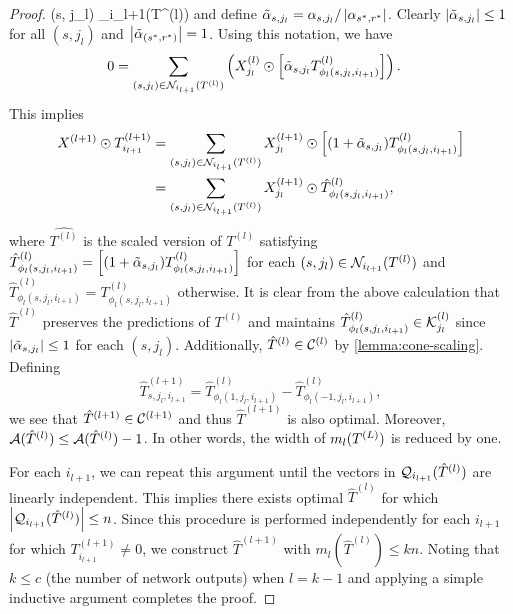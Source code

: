 \begin{proof}
{        (s, j_l) \in \calN_{i_{l+1}}(T^{(l)})} \)
    and define \( \tilde{\alpha}_{s, j_l} = \alpha_{s, j_l} / \left\vert \alpha_{s^* ,r^*}\right\vert \).
    Clearly \( \left\vert \tilde{\alpha}_{s, j_l}\right\vert \leq 1 \) for all \( (s, j_l) \)
    and \( \left\vert \tilde{\alpha}_{(s^*, r^*)}\right\vert = 1 \).
    Using this notation, we have
    \begin{align*}
        0 & = \sum_{(s, j_l) \in \mathcal{N}_{i_{l+1}}(T^{(l)})}
        \left(X^{(l)}_{j_l} \odot \left[\tilde{\alpha}_{s, j_l} T^{(l)}_{\phi_{l}(s, j_l, i_{l+1})}\right]\right).
    \end{align*}
    This implies
    \begin{align*}
        X^{(l+1)} \odot T^{(l+1)}_{i_{l+1}}
         & = \sum_{(s, j_l) \in \mathcal{N}_{i_{l+1}}(T^{(l)})}
        X^{(l+1)}_{j_l} \odot
        \left[(1 + \tilde{\alpha}_{s, j_l}) T^{(l)}_{\phi_{l}(s, j_l, i_{l+1})}\right] \\
         & = \sum_{(s,j_l) \in \mathcal{N}_{i_{l+1}}(T^{(l)})}
        X^{(l+1)}_{j_l} \odot
        \hat{T}^{(l)}_{\phi_{l}(s, j_l, i_{l+1})},
    \end{align*}
    where \( \hat{T^{(l)}} \) is the scaled version of \( T^{(l)} \)
    satisfying
    \( \hat{T}^{(l)}_{\phi_{l}(s, j_l, i_{l+1})}
    = \left[(1 + \tilde{\alpha}_{s, j_l}) T^{(l)}_{\phi_{l}(s, j_l, i_{l+1})}\right] \)
    for each \( (s, j_l) \in \mathcal{N}_{i_{l+1}}(T^{(l)}) \) and
    \( \hat{T}^{(l)}_{\phi_{l}(s, j_l, i_{l+1})} = T^{(l)}_{\phi_{l}(s, j_l, i_{l+1})} \)
    otherwise.
    It is clear from the above calculation that \( \hat{T}^{(l)} \) preserves
    the predictions of \( T^{(l)} \)
    and maintains \( \hat{T}^{(l)}_{\phi_{l}(s, j_l, i_{l+1})} \in \mathcal{K}_{j_l}^{(l)} \)
    since \( \left\vert \tilde{\alpha}_{s, j_l}\right\vert \leq 1 \) for each \( (s, j_l) \).
    Additionally, \( \hat{T}^{(l)} \in \mathcal{C}^{(l)} \) by \cref{lemma:cone-scaling}.
    Defining
    \[
        \hat{T}^{(l+1)}_{s, j_l, i_{l+1}} =
        \hat{T}^{(l)}_{\phi_{l}(1, j_l, i_{l+1})}
        - \hat{T}^{(l)}_{\phi_{l}(-1, j_l, i_{l+1})},
    \]
    we see that \( \hat{T}^{(l+1)} \in \mathcal{C}^{(l+1)} \)
    and thus \( \hat{T}^{(l+1)} \) is also optimal.
    Moreover,
    \( \mathcal{A}(\hat{T}^{(l)}) \leq \mathcal{A}(\hat{T}^{(l)}) - 1 \).
    In other words, the width of \( m_l(T^{(L)}) \) is reduced by one.

    For each \( i_{l+1} \), we can repeat this argument until the vectors
    in \( \mathcal{Q}_{i_{l+1}}(\hat{T}^{(l)}) \) are linearly independent.
    This implies there exists optimal \( \hat{T}^{(l)} \)
    for which \( \left\vert \mathcal{Q}_{i_{l+1}}(\hat{T}^{(l)})\right\vert \leq n \).
    Since this procedure is performed independently for each \( i_{l+1} \)
    for which \( T^{(l+1)}_{i_{l+1}} \neq 0 \), we construct
    \( \hat{T}^{(l+1)} \) with
    \( m_{l}(\hat{T}^{(l)}) \leq k n \).
    Noting that \( k \leq c \) (the number of network outputs) when
    \( l = k - 1 \) and applying a simple inductive argument completes the
    proof.
\end{proof}

